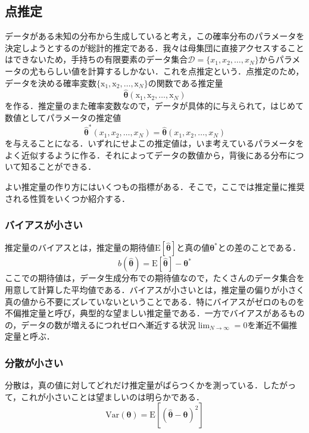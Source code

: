 \documentclass[a4paper,11pt]{jsreport}
\begin{document}
\subsection{点推定}
データがある未知の分布から生成していると考え，この確率分布のパラメータを決定しようとするのが総計的推定である．我々は母集団に直接アクセスすることはできないため，手持ちの有限要素のデータ集合$\mathcal{D} = \{ x_1, x_2,\dots, x_N \}$からパラメータの尤もらしい値を計算するしかない．これを点推定という．点推定のため，データを決める確率変数$\{ \mathrm{x}_1, \mathrm{x}_2, \dots, \mathrm{x}_N \}$の関数である推定量
\begin{equation}
  \hat{\bm{\theta}}( \mathrm{x}_1, \mathrm{x}_2, \dots, \mathrm{x}_N )
\end{equation}
を作る．推定量のまた確率変数なので，データが具体的に与えられて，はじめて数値としてパラメータの推定値
\begin{equation}
  \hat{\bm{\theta}}^*( x_1, x_2, \dots, x_N )
  =\hat{\bm{\theta}}( x_1, x_2, \dots, x_N )
\end{equation}
を与えることになる．いずれにせよこの推定値は，いま考えているパラメータをよく近似するように作る．それによってデータの数値から，背後にある分布について知ることができる．\par
よい推定量の作り方にはいくつもの指標がある．そこで，ここでは推定量に推奨される性質をいくつか紹介する．

\subsubsection*{バイアスが小さい}
推定量のバイアスとは，推定量の期待値$\mathrm{E} \left[ \hat{\bm{\theta}} \right]$と真の値$\bm{\theta}^*$との差のことである．
\begin{equation}
  b\left( \hat{\bm{\theta}} \right)
  = \mathrm{E} \left[ \hat{\bm{\theta}} \right] - \bm{\theta}^*
\end{equation}
ここでの期待値は，データ生成分布での期待値なので，たくさんのデータ集合を用意して計算した平均値である．バイアスが小さいとは，推定量の偏りが小さく真の値から不要にズレていないということである．特にバイアスがゼロのものを不偏推定量と呼び，典型的な望ましい推定量である．一方でバイアスがあるものの，データの数が増えるにつれゼロへ漸近する状況$\lim_{N \rightarrow \infty} = 0$を漸近不偏推定量と呼ぶ．

\subsubsection*{分散が小さい}
分散は，真の値に対してどれだけ推定量がばらつくかを測っている．したがって，これが小さいことは望ましいのは明らかである．
\begin{equation}
  \text{Var}\left( \bm{\theta} \right)
  = \mathrm{E} \left[ \left( \hat{\bm{\theta}} - \bm{\theta} \right)^2 \right]
\end{equation}
\end{document}
